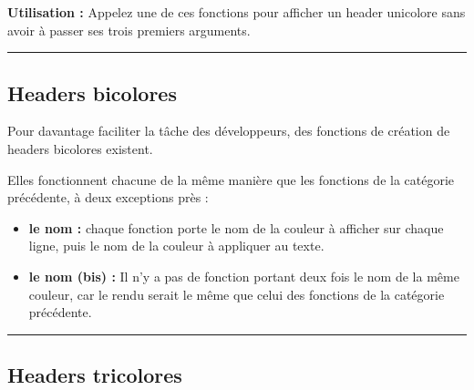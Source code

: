 \documentclass[a4paper,10pt]{article}
\begin{document}
\begin{justify}
    \textbf{Utilisation :}
    Appelez une de ces fonctions pour afficher un header unicolore sans avoir à passer ses trois premiers arguments.
\end{justify}




\color{green}\par\noindent\rule{\textwidth}{0.4pt}\color{white}

\color{green}
\subsection{Headers bicolores}\color{white}

\begin{justify}
    Pour davantage faciliter la tâche des développeurs, des fonctions de création de headers bicolores existent.
\end{justify}

\begin{justify}
    Elles fonctionnent chacune de la même manière que les fonctions de la catégorie précédente, à deux exceptions près :

    \begin{itemize}
        \item \textbf{le nom :} chaque fonction porte le nom de la couleur à afficher sur chaque ligne, puis le nom de la couleur à appliquer au texte.\\

        \item \textbf{le nom (bis) :} Il n'y a pas de fonction portant deux fois le nom de la même couleur, car le rendu serait le même que celui des fonctions de la catégorie précédente.
    \end{itemize}
\end{justify}




\color{green}\par\noindent\rule{\textwidth}{0.4pt}\color{white}

\color{green}
\subsection{Headers tricolores}\color{white}
\end{document}
